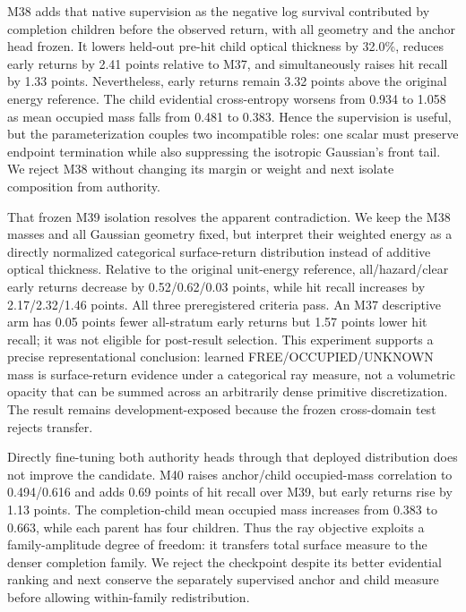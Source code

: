 M38 adds that native supervision as the negative log survival contributed by completion children before the observed
return, with all geometry and the anchor head frozen. It lowers held-out pre-hit child optical thickness by 32.0\%, reduces
early returns by 2.41 points relative to M37, and simultaneously raises hit recall by 1.33 points. Nevertheless, early
returns remain 3.32 points above the original energy reference. The child evidential cross-entropy worsens from 0.934 to
1.058 as mean occupied mass falls from 0.481 to 0.383. Hence the supervision is useful, but the parameterization couples
two incompatible roles: one scalar must preserve endpoint termination while also suppressing the isotropic Gaussian's
front tail. We reject M38 without changing its margin or weight and next isolate composition from authority.

That frozen M39 isolation resolves the apparent contradiction. We keep the M38 masses and all Gaussian geometry fixed,
but interpret their weighted energy as a directly normalized categorical surface-return distribution instead of additive
optical thickness. Relative to the original unit-energy reference, all/hazard/clear early returns decrease by
0.52/0.62/0.03 points, while hit recall increases by 2.17/2.32/1.46 points. All three preregistered criteria pass. An M37
descriptive arm has 0.05 points fewer all-stratum early returns but 1.57 points lower hit recall; it was not eligible for
post-result selection. This experiment supports a precise representational conclusion: learned FREE/OCCUPIED/UNKNOWN mass
is surface-return evidence under a categorical ray measure, not a volumetric opacity that can be summed across an
arbitrarily dense primitive discretization. The result remains development-exposed because the frozen cross-domain test rejects transfer.

Directly fine-tuning both authority heads through that deployed distribution does not improve the candidate. M40 raises
anchor/child occupied-mass correlation to 0.494/0.616 and adds 0.69 points of hit recall over M39, but early returns rise by
1.13 points. The completion-child mean occupied mass increases from 0.383 to 0.663, while each parent has four children.
Thus the ray objective exploits a family-amplitude degree of freedom: it transfers total surface measure to the denser
completion family. We reject the checkpoint despite its better evidential ranking and next conserve the separately
supervised anchor and child measure before allowing within-family redistribution.

